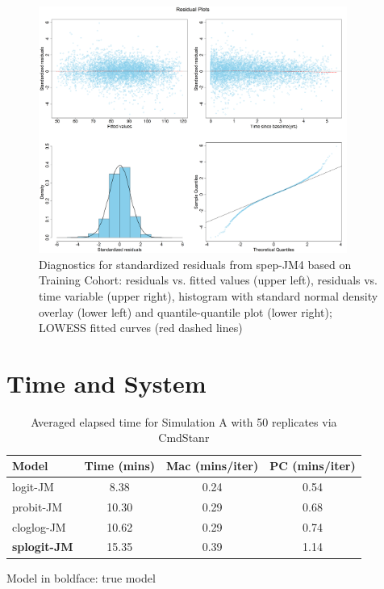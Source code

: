 \begin{figure}[H]
\centering
\includegraphics[width=0.9\textwidth]{Figures/Chp2_residual.png}
\caption{Diagnostics for standardized residuals from spep-JM4 based on Training Cohort: residuals vs. fitted values (upper left), residuals vs. time variable (upper right), histogram with standard normal density overlay (lower left) and quantile-quantile plot (lower right); LOWESS fitted curves (red dashed lines)}
\label{fig:chp2_residual}
\end{figure}


\section{Time and System}

\begin{center}
\begin{table}[H]
\caption{Averaged elapsed time for Simulation A with 50 replicates via CmdStanr}
 \centering \small
  \begin{threeparttable}
  \begin{tabular}{l|c|c|c}
    \toprule
Model & Time (mins) & Mac (mins/iter) & PC (mins/iter) \\
 \hline 
 logit-JM & 8.38 & 0.24 & 0.54 \\
 probit-JM & 10.30 & 0.29 & 0.68 \\
 cloglog-JM & 10.62 & 0.29 & 0.74 \\
 \bf splogit-JM & 15.35 & 0.39 & 1.14 \\
    \bottomrule
  \end{tabular}
  \begin{tablenotes}[para]
    \footnotesize
    Model in boldface: true model
    \end{tablenotes}
\end{threeparttable}
\end{table}
\label{tab:appb_simA}
\end{center}


